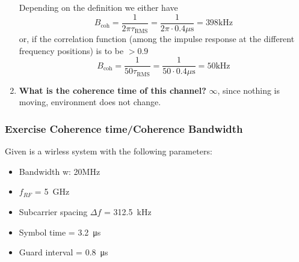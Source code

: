\begin{enumerate}
    Depending on the definition we either have
    $$
    B_{\mathrm{coh}}=\frac{1}{2 \pi \tau_{\mathrm{RMS}}}=\frac{1}{2 \pi \cdot 0.4 \mu \mathrm{s}}=398 \mathrm{kHz}
    $$
    or, if the correlation function (among the impulse response at the different frequency positions) is to be $>0.9$
    $$
    B_{\mathrm{coh}}=\frac{1}{50 \tau_{\mathrm{RMS}}}=\frac{1}{50 \cdot 0.4 \mu \mathrm{s}}=50 \mathrm{kHz}
    $$
    \item \textbf{What is the coherence time of this channel?} \newline
    $\infty$, since nothing is moving, environment does not change.
    
\end{enumerate}
\subsubsection{Exercise Coherence time/Coherence Bandwidth}
Given is a wirless system with the following parameters:
\begin{itemize}
    \item Bandwidth w: 20MHz
    \item $f_{RF}$ = \SI{5}{\giga\hertz}
    \item Subcarrier spacing $\Delta f$ = \SI{312.5}{\kilo\hertz}
    \item Symbol time = \SI{3.2}{\micro\second}
    \item Guard interval = \SI{0.8}{\micro\second}
\end{itemize}

